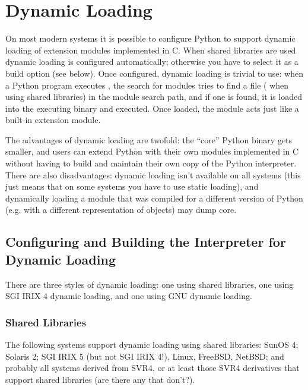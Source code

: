 \documentclass{manual}
\begin{document}
\chapter{Dynamic Loading
         \label{dynload}}

On most modern systems it is possible to configure Python to support
dynamic loading of extension modules implemented in C.  When shared
libraries are used dynamic loading is configured automatically;
otherwise you have to select it as a build option (see below).  Once
configured, dynamic loading is trivial to use: when a Python program
executes , the search for modules tries to find a
file  ( when using shared
libraries) in the module search path,%
and if one is found, it is loaded into the executing binary and
executed.  Once loaded, the module acts just like a built-in extension
module.

The advantages of dynamic loading are twofold: the ``core'' Python
binary gets smaller, and users can extend Python with their own
modules implemented in C without having to build and maintain their
own copy of the Python interpreter.  There are also disadvantages:
dynamic loading isn't available on all systems (this just means that
on some systems you have to use static loading), and dynamically
loading a module that was compiled for a different version of Python
(e.g. with a different representation of objects) may dump core.


\section{Configuring and Building the Interpreter for Dynamic Loading
         \label{dynloadConfig}}

There are three styles of dynamic loading: one using shared libraries,
one using SGI IRIX 4 dynamic loading, and one using GNU dynamic
loading.

\subsection{Shared Libraries
            \label{sharedlibs}}

The following systems support dynamic loading using shared libraries:
SunOS 4; Solaris 2; SGI IRIX 5 (but not SGI IRIX 4!), Linux, FreeBSD,
NetBSD; and probably all systems derived from SVR4, or at least those
SVR4 derivatives that support shared libraries (are there any that
don't?).
\end{document}
